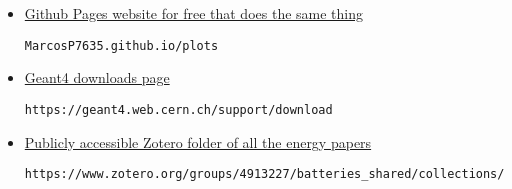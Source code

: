 \documentclass[12pt]{article}
\begin{document}
\begin{itemize}
\item \href{https://MarcosP7635.github.io/plots}{Github Pages website for free that does the same thing}
\begin{lstlisting}[breaklines]
MarcosP7635.github.io/plots
\end{lstlisting}

\item \href{https://geant4.web.cern.ch/support/download}{Geant4 downloads page}
\begin{lstlisting}[breaklines]
https://geant4.web.cern.ch/support/download
\end{lstlisting}

\item \href{https://www.zotero.org/groups/4913227/batteries_shared/collections/JRPIH93Y}{Publicly accessible Zotero folder of all the energy papers}
\begin{lstlisting}[breaklines]
https://www.zotero.org/groups/4913227/batteries_shared/collections/JRPIH93Y\end{lstlisting}

\end{itemize}
\end{document}
